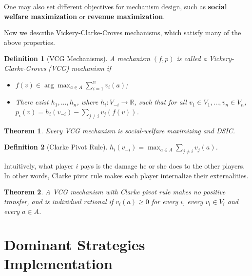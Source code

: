 \documentclass[openany]{book}
\newtheorem{definition}{Definition}[chapter]
\newtheorem{theorem}{Theorem}[chapter]
\theoremstyle{remark}
\begin{document}
One may also set different objectives for mechanism design, such as \textbf{social welfare maximization} or \textbf{revenue maximization}.

Now we describe Vickery-Clarke-Croves mechanisms, which satisfy many of the above properties.
\begin{definition}[VCG Mechanisms]
    A mechanism $(f,p)$ is called a Vickery-Clarke-Groves (VCG) mechanism if
    \begin{itemize}
        \item $f(v)\in\arg\max_{a\in A}\sum_{i=1}^{n}v_i(a)$;
        \item There exist $h_1,\ldots,h_n$, where $h_i:V_{-i}\to \mathbb{R}$, such that for all $v_1\in V_1,\ldots,v_n\in V_n$, $p_i(v)=h_i(v_{-i})-\sum_{j\ne i}^{}v_j(f(v))$.
    \end{itemize}
\end{definition}
\begin{theorem}
    Every VCG mechanism is social-welfare maximizing and DSIC.
\end{theorem}
\begin{definition}[Clarke Pivot Rule]
    $h_i(v_{-i})=\max_{a\in A}\sum_{j\ne i}^{}v_j(a)$.
\end{definition}
Intuitively, what player $i$ pays is the damage he or she does to the other players. In other words, Clarke pivot rule makes each player internalize their externalities.
\begin{theorem}
    A VCG mechanism with Clarke pivot rule makes no positive transfer, and is individual rational if $v_i(a)\ge0$ for every $i$, every $v_i\in V_i$ and every $a\in A$.
\end{theorem}

\section{Dominant Strategies Implementation}
\end{document}
